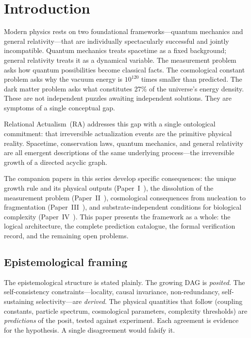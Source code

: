 \documentclass[11pt,a4paper]{article}
\theoremstyle{plain}
\theoremstyle{definition}
\theoremstyle{remark}
\begin{document}
\section{Introduction}\label{sec:intro}

Modern physics rests on two foundational frameworks---quantum mechanics and
general relativity---that are individually spectacularly successful and jointly
incompatible.  Quantum mechanics treats spacetime as a fixed background; general
relativity treats it as a dynamical variable.  The measurement problem asks how
quantum possibilities become classical facts.  The cosmological constant problem
asks why the vacuum energy is $10^{120}$ times smaller than predicted.  The dark
matter problem asks what constitutes 27\% of the universe's energy density.
These are not independent puzzles awaiting independent solutions.  They are
symptoms of a single conceptual gap.

Relational Actualism~(RA) addresses this gap with a single ontological
commitment: that irreversible actualization events are the primitive physical
reality.  Spacetime, conservation laws, quantum mechanics, and general
relativity are all emergent descriptions of the same underlying process---the
irreversible growth of a directed acyclic graph.

The companion papers in this series develop specific consequences: the unique
growth rule and its physical outputs (Paper~I~\cite{P1}), the dissolution of
the measurement problem (Paper~II~\cite{P2}), cosmological consequences from
nucleation to fragmentation (Paper~III~\cite{P3}), and substrate-independent
conditions for biological complexity (Paper~IV~\cite{P4}).  This paper presents
the framework as a whole: the logical architecture, the complete prediction
catalogue, the formal verification record, and the remaining open problems.

\subsection{Epistemological framing}\label{sec:epistemology}

The epistemological structure is stated plainly.  The growing DAG is
\emph{posited}.  The self-consistency constraints---locality, causal invariance,
non-redundancy, self-sustaining selectivity---are \emph{derived}.  The physical
quantities that follow (coupling constants, particle spectrum, cosmological
parameters, complexity thresholds) are \emph{predictions} of the posit, tested
against experiment.  Each agreement is evidence for the hypothesis.  A single
disagreement would falsify it.
\end{document}

